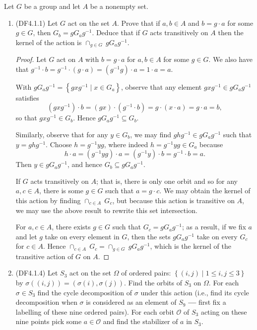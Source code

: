 \documentclass[11pt]{article}
\newcommand{\cbr}[1]{\left\{#1\right\}}
\begin{document}
Let $G$ be a group and let $A$ be a nonempty set.
\begin{enumerate}
    \item (DF4.1.1) Let $G$ act on the set $A$. Prove that if $a,b\in A$ and $b = g\cdot a$ for some $g\in G$, then $G_b = gG_ag^{-1}$. Deduce that if $G$ acts transitively on $A$ then the kernel of the action is $\cap_{g\in G}~ gG_ag^{-1}$.
    \begin{proof}
        Let $G$ act on $A$ with $b = g\cdot a$ for $a,b\in A$ for some $g\in G$. We also have that $g^{-1}\cdot b = g^{-1}\cdot (g\cdot a) = (g^{-1}g)\cdot a = 1\cdot a = a$.

        With $gG_ag^{-1} = \cbr{gxg^{-1}\mid x\in G_a}$, observe that any element $gxg^{-1}\in gG_ag^{-1}$ satisfies \[(gxg^{-1})\cdot b = (gx)\cdot (g^{-1}\cdot b) = g\cdot (x\cdot a) = g\cdot a = b,\] so that $gxg^{-1} \in G_b$. Hence $gG_ag^{-1} \subseteq G_b$.

        Similarly, observe that for any $y \in G_b$, we may find $ghg^{-1}\in gG_ag^{-1}$ such that $y = ghg^{-1}$. Choose $h = g^{-1}yg$, where indeed $h = g^{-1}yg\in G_a$ because \[h\cdot a = (g^{-1}yg)\cdot a = (g^{-1}y)\cdot b = g^{-1}\cdot b = a.\]
        Then $y\in gG_ag^{-1}$, and hence $G_b\subseteq gG_ag^{-1}$.

        If $G$ acts transitively on $A$; that is, there is only one orbit and so for any $a,c\in A$, there is some $g\in G$ such that $a = g\cdot c$. We may obtain the kernel of this action by finding $\cap_{c\in A}~ G_c$, but because this action is transitive on $A$, we may use the above result to rewrite this set intersection.
        
        For $a,c\in A$, there exists $g\in G$ such that $G_c = gG_ag^{-1}$; as a result, if we fix $a$ and let $g$ take on every element in $G$, then the sets $gG_ag^{-1}$ take on every $G_c$ for $c\in A$. Hence $\cap_{c\in A}~ G_c = \cap_{g\in G}~ gG_ag^{-1}$, which is the kernel of the transitive action of $G$ on $A$.
    \end{proof}
    \item (DF4.1.4) Let $S_3$ act on the set $\Omega$ of ordered pairs: $\cbr{(i,j)\mid 1\leq i,j\leq 3}$ by $\sigma((i,j)) = (\sigma(i),\sigma(j))$. Find the orbits of $S_3$ on $\Omega$. For each $\sigma\in S_3$ find the cycle decomposition of $\sigma$ under this action (i.e., find its cycle decomposition when $\sigma$ is considered as an element of $S_9$ \textbf{---} first fix a labelling of these nine ordered pairs). For each orbit $\mathcal{O}$ of $S_3$ acting on these nine points pick some $a\in \mathcal{O}$ and find the stabilizer of $a$ in $S_3$.
    

\end{enumerate}
\end{document}
